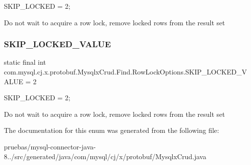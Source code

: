 {\ttfamily S\+K\+I\+P\+\_\+\+L\+O\+C\+K\+ED = 2;}


\begin{DoxyPre}
Do not wait to acquire a row lock, remove locked rows from the result set
\end{DoxyPre}
 \mbox{\label{enumcom_1_1mysql_1_1cj_1_1x_1_1protobuf_1_1_mysqlx_crud_1_1_find_1_1_row_lock_options_acdab3701d93fa0c87ffa68bf407ecd12}} 
\subsubsection{\texorpdfstring{S\+K\+I\+P\+\_\+\+L\+O\+C\+K\+E\+D\+\_\+\+V\+A\+L\+UE}{SKIP\_LOCKED\_VALUE}}
{\footnotesize\ttfamily  static  final int com.\+mysql.\+cj.\+x.\+protobuf.\+Mysqlx\+Crud.\+Find.\+Row\+Lock\+Options.\+S\+K\+I\+P\+\_\+\+L\+O\+C\+K\+E\+D\+\_\+\+V\+A\+L\+UE = 2\hspace{0.3cm}{\ttfamily [static]}}

{\ttfamily S\+K\+I\+P\+\_\+\+L\+O\+C\+K\+ED = 2;}


\begin{DoxyPre}
Do not wait to acquire a row lock, remove locked rows from the result set
\end{DoxyPre}
 

The documentation for this enum was generated from the following file\+:\begin{DoxyCompactItemize}
\item 
pruebas/mysql-\/connector-\/java-\/8../src/generated/java/com/mysql/cj/x/protobuf/Mysqlx\+Crud.\+java\end{DoxyCompactItemize}
